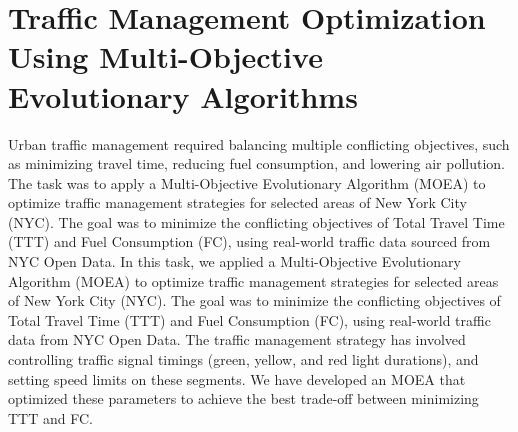 \section{Traffic Management Optimization Using Multi-Objective Evolutionary Algorithms}
Urban traffic management required balancing multiple conflicting objectives, such as minimizing travel time, reducing fuel consumption, and lowering air pollution. The task was to apply a Multi-Objective Evolutionary Algorithm (MOEA) to optimize traffic management strategies for selected areas of New York City (NYC). The goal was to minimize the conflicting objectives of Total Travel Time (TTT) and Fuel Consumption (FC), using real-world traffic data sourced from NYC Open Data.
\newline
\newline
In this task, we applied a Multi-Objective Evolutionary Algorithm (MOEA) to optimize traffic management strategies for selected areas of New York City (NYC). The goal was to minimize the conflicting objectives of Total Travel Time (TTT) and Fuel Consumption (FC), using real-world traffic data from NYC Open Data. 
\newline
The traffic management strategy has involved controlling traffic signal timings (green, yellow, and red light durations), and setting speed limits on these segments. We have developed an MOEA that optimized these parameters to achieve the best trade-off between minimizing TTT and FC.
\newline
